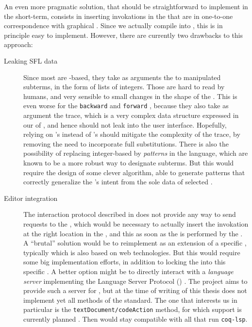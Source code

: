 An even more pragmatic solution, that should be straightforward to implement in
the short-term, consists in inserting  invokations in the 
that are in one-to-one correspondence with graphical . Since we actually
compile  into , this is in principle easy to implement. However,
there are currently two drawbacks to this approach:
\begin{description}
  \item[Leaking SFL data] Since most  are -based,
  they take as arguments the  to manipulated subterms, in the form of
  lists of integers. Those are hard to read by humans, and very sensible to
  small changes in the shape of the . This is even worse for the
  \texttt{backward} and \texttt{forward} , because they also take as
  argument the  trace, which is a very complex data
  structure expressed in our  of , and hence should
  not leak into the user interface. Hopefully, relying on 's
   instead of 's should mitigate the complexity of
  the trace, by removing the need to incorporate full substitutions. There is
  also the possibility of replacing integer-based  by \emph{patterns}
  in the {\kl{\ssreflect}} language, which are known to be a more robust way to
  designate subterms. But this would require the design of some clever
  algorithm, able to generate patterns that correctly generalize the
  's intent from the sole data of selected .

  \item[Editor integration] The interaction protocol described in
   does not provide any way to send requests to the
  , which would be necessary to actually insert the 
  invokation at the right location in the , and this as soon as
  the  is performed by the . A ``brutal'' solution would be
  to reimplement  as an extension of a specific ,
  typically  which is also based on web technologies. But this would
  require some big implementation efforts, in addition to locking the
   into this specific . A better option might be to
  directly interact with a \emph{language server} implementing the Language
  Server Protocol () \cite{LSP}. The  project aims to
  provide such a server for , but at the time of writing of this thesis
  does not implement yet all methods of the  standard. The one that
  interests us in particular is the \texttt{textDocument/codeAction} method, for
  which support is currently planned \cite{coq-lsp-proto}. Then 
  would stay compatible with all  that run \texttt{coq-lsp}.
\end{description}